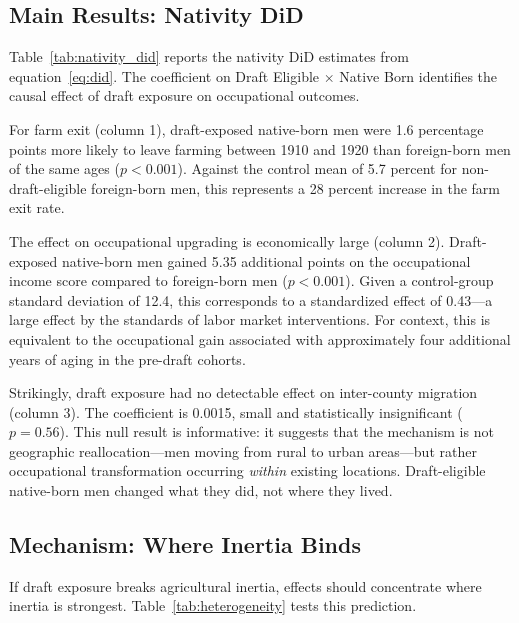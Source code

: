 \documentclass[12pt]{article}
\begin{document}
\subsection{Main Results: Nativity DiD}

Table~\ref{tab:nativity_did} reports the nativity DiD estimates from equation~\eqref{eq:did}. The coefficient on Draft Eligible $\times$ Native Born identifies the causal effect of draft exposure on occupational outcomes.

For farm exit (column 1), draft-exposed native-born men were 1.6 percentage points more likely to leave farming between 1910 and 1920 than foreign-born men of the same ages ($p < 0.001$). Against the control mean of 5.7 percent for non-draft-eligible foreign-born men, this represents a 28 percent increase in the farm exit rate.

The effect on occupational upgrading is economically large (column 2). Draft-exposed native-born men gained 5.35 additional points on the occupational income score compared to foreign-born men ($p < 0.001$). Given a control-group standard deviation of 12.4, this corresponds to a standardized effect of 0.43---a large effect by the standards of labor market interventions. For context, this is equivalent to the occupational gain associated with approximately four additional years of aging in the pre-draft cohorts.

Strikingly, draft exposure had no detectable effect on inter-county migration (column 3). The coefficient is 0.0015, small and statistically insignificant ($p = 0.56$). This null result is informative: it suggests that the mechanism is not geographic reallocation---men moving from rural to urban areas---but rather occupational transformation occurring \textit{within} existing locations. Draft-eligible native-born men changed what they did, not where they lived.



\subsection{Mechanism: Where Inertia Binds}

If draft exposure breaks agricultural inertia, effects should concentrate where inertia is strongest. Table~\ref{tab:heterogeneity} tests this prediction.
\end{document}
